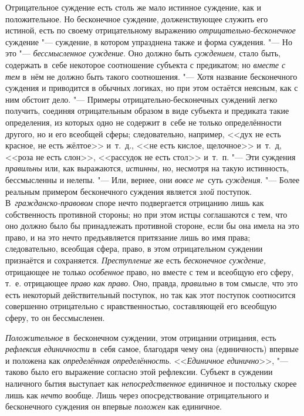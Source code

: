 Отрицательное суждение есть столь же мало истинное суждение,
как и положительное. Но бесконечное суждение, долженствующее служить его
истиной, есть по своему отрицательному выражению {\em отрицательно-бесконечное}
суждение "--- суждение, в котором упразднена также и форма суждения. "--- Но
это "--- {\em бессмысленное суждение}. Оно должно быть {\em суждением,} стало
быть, содержать в~себе некоторое соотношение субъекта с предикатом; но
{\em вместе с тем} в~нём не должно быть такого соотношения. "--- Хотя название
бесконечного суждения и приводится в обычных логиках, но при этом остаётся
неясным, как с ним обстоит дело. "--- Примеры
отрицательно-бесконечных суждений легко получить, соединяя отрицательным
образом в виде субъекта и предиката такие определения, из которых одно не
содержит в~себе не только определённости другого, но и его всеобщей сферы;
следовательно, например, <<дух не есть красное, не есть жёлтое>> и~т.~д., <<не
есть кислое, щелочное>> и~т.~д, <<роза не есть слон>>, <<рассудок не есть
стол>> и~т.~п. "--- Эти суждения {\em правильны} или, как выражаются,
{\em истинны,} но, несмотря на такую истинность, бессмысленны и нелепы. "---
Или, вернее, они {\em вовсе не}~суть {\em суждения}. "--- Более
реальным примером бесконечного суждения является
{\em злой} поступок. В~{\em гражданско-правовом}
споре нечто подвергается отрицанию лишь как собственность
противной стороны; но при этом истцы соглашаются с тем, что оно должно было
бы принадлежать противной стороне, если бы она имела на это право, и на это
нечто предъявляется притязание лишь во имя права; следовательно, всеобщая
сфера, право, в этом отрицательном суждении признаётся и сохраняется.
{\em Преступление} же есть {\em бесконечное суждение,} отрицающее не только
{\em особенное} право, но вместе с тем и всеобщую его сферу, т.~е. отрицающее
{\em право как право}. Оно, правда, {\em правильно} в том
смысле, что это есть некоторый действительный поступок, но так как этот
поступок соотносится совершенно отрицательно с нравственностью,
составляющей его всеобщую сферу, то он бессмысленен.

{\em Положительное} в~бесконечном суждении, этом отрицании отрицания, есть
{\em рефлексия единичности} в~себя самое, благодаря чему она (единичность)
впервые и положена как {\em определённая определённость}.
<<{\em Единичное единично}>>, "--- таково было его выражение согласно этой
рефлексии. Субъект в суждении наличного бытия выступает как
{\em непосредственное} единичное и постольку скорее лишь как {\em нечто}
вообще. Лишь через опосредствование отрицательного и бесконечного суждения
он впервые {\em положен} как единичное.


